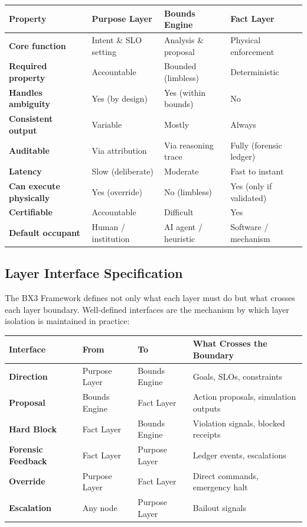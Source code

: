 \documentclass[12pt]{article}
\begin{document}
\begin{center}
\begin{tabular}{>{\bfseries}p{2.0cm} p{3.0cm} p{3.0cm} p{2.5cm}}
\toprule
\textbf{Property} & \textbf{Purpose Layer} & \textbf{Bounds Engine} & \textbf{Fact Layer} \\
\midrule
Core function & Intent \& SLO setting & Analysis \& proposal & Physical enforcement \\
\addlinespace
Required property & Accountable & Bounded (limbless) & Deterministic \\
\addlinespace
Handles ambiguity & Yes (by design) & Yes (within bounds) & No \\
\addlinespace
Consistent output & Variable & Mostly & Always \\
\addlinespace
Auditable & Via attribution & Via reasoning trace & Fully (forensic ledger) \\
\addlinespace
Latency & Slow (deliberate) & Moderate & Fast to instant \\
\addlinespace
Can execute physically & Yes (override) & No (limbless) & Yes (only if validated) \\
\addlinespace
Certifiable & Accountable & Difficult & Yes \\
\addlinespace
Default occupant & Human / institution & AI agent / heuristic & Software / mechanism \\
\bottomrule
\end{tabular}
\end{center}

\subsection{Layer Interface Specification}

The BX3 Framework defines not only what each layer must do but what crosses each layer boundary. Well-defined interfaces are the mechanism by which layer isolation is maintained in practice:

\begin{center}
\begin{tabular}{>{\bfseries}p{2.2cm} p{1.8cm} p{1.8cm} p{5.2cm}}
\toprule
\textbf{Interface} & \textbf{From} & \textbf{To} & \textbf{What Crosses the Boundary} \\
\midrule
Direction & Purpose Layer & Bounds Engine & Goals, SLOs, constraints \\
\addlinespace
Proposal & Bounds Engine & Fact Layer & Action proposals, simulation outputs \\
\addlinespace
Hard Block & Fact Layer & Bounds Engine & Violation signals, blocked receipts \\
\addlinespace
Forensic Feedback & Fact Layer & Purpose Layer & Ledger events, escalations \\
\addlinespace
Override & Purpose Layer & Fact Layer & Direct commands, emergency halt \\
\addlinespace
Escalation & Any node & Purpose Layer & Bailout signals \\
\bottomrule
\end{tabular}
\end{center}
\end{document}
